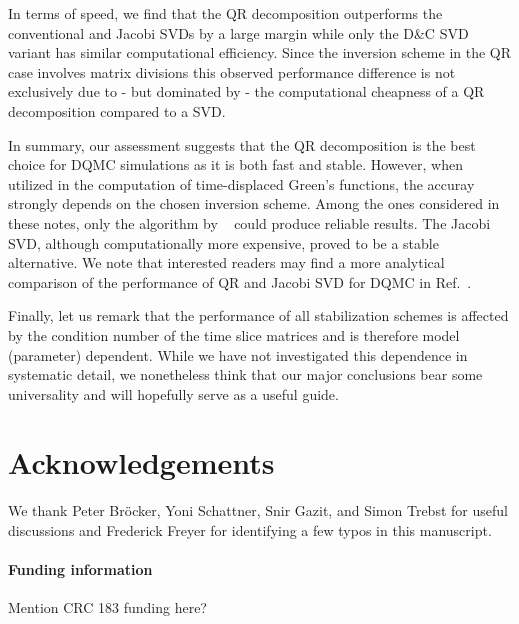 \documentclass[submission, Phys]{SciPost}
\begin{document}
In terms of speed, we find that the QR decomposition outperforms the conventional and Jacobi SVDs by a large margin while only the D\&C SVD variant has similar computational efficiency. Since the inversion scheme in the QR case involves matrix divisions this observed performance difference is not exclusively due to - but dominated by - the computational cheapness of a QR decomposition compared to a SVD.

In summary, our assessment suggests that the QR decomposition is the best choice for DQMC simulations as it is both fast and stable. However, when utilized in the computation of time-displaced Green's functions, the accuray strongly depends on the chosen inversion scheme. Among the ones considered in these notes, only the algorithm by  ~\cite{Loh1989} could produce reliable results. The Jacobi SVD, although computationally more expensive, proved to be a stable alternative. We note that interested readers may find a more analytical comparison of the performance of QR and Jacobi SVD for DQMC in Ref.~\cite{Bai2011}.

Finally, let us remark that the performance of all stabilization schemes is affected by the condition number of the time slice matrices and is therefore model (parameter) dependent. While we have not investigated this dependence in systematic detail,  we nonetheless think that our major conclusions bear some universality and will hopefully serve as a useful guide.



\section*{Acknowledgements}
We thank Peter Bröcker, Yoni Schattner, Snir Gazit, and Simon Trebst for useful discussions and Frederick Freyer for identifying a few typos in this manuscript.

\paragraph{Funding information}
Mention CRC 183 funding here?


\end{document}
